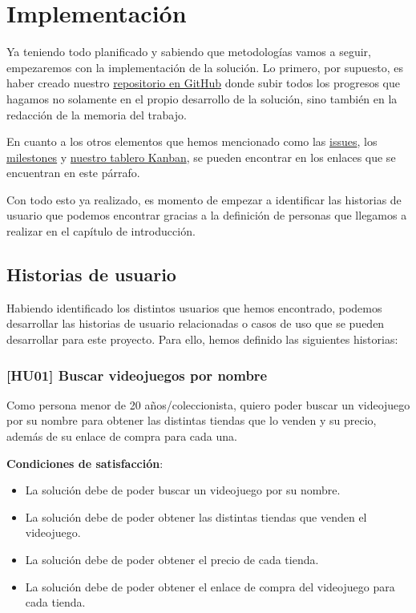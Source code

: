 \chapter{Implementación}

Ya teniendo todo planificado y sabiendo que metodologías vamos a seguir, 
empezaremos con la implementación de la solución. Lo primero, por supuesto, es 
haber creado nuestro \href{https://github.com/jero-dev/proyecto-tfg}
{repositorio en GitHub} donde subir todos los progresos que hagamos no solamente en 
el propio desarrollo de la solución, sino también en la redacción de la memoria del 
trabajo.

En cuanto a los otros elementos que hemos mencionado como las 
\href{https://github.com/jero-dev/proyecto-tfg/issues}{issues}, los 
\href{https://github.com/jero-dev/proyecto-tfg/milestones}{milestones} y 
\href{https://github.com/users/jero-dev/projects/1}{nuestro tablero Kanban}, se 
pueden encontrar en los enlaces que se encuentran en este párrafo.

Con todo esto ya realizado, es momento de empezar a identificar las historias de 
usuario que podemos encontrar gracias a la definición de personas que llegamos a 
realizar en el capítulo de introducción.

\section{Historias de usuario}

Habiendo identificado los distintos usuarios que hemos encontrado, podemos 
desarrollar las historias de usuario relacionadas o casos de uso que se pueden 
desarrollar para este proyecto. Para ello, hemos definido las siguientes historias:

\subsection{[HU01] Buscar videojuegos por nombre}

Como persona menor de 20 años/coleccionista, quiero poder buscar un videojuego por 
su nombre para obtener las distintas tiendas que lo venden y su precio, además de 
su enlace de compra para cada una.

\textbf{Condiciones de satisfacción}:

\begin{itemize}
    \item La solución debe de poder buscar un videojuego por su nombre.
    \item La solución debe de poder obtener las distintas tiendas que venden el 
    videojuego.
    \item La solución debe de poder obtener el precio de cada tienda.
    \item La solución debe de poder obtener el enlace de compra del videojuego para 
    cada tienda.
\end{itemize}

